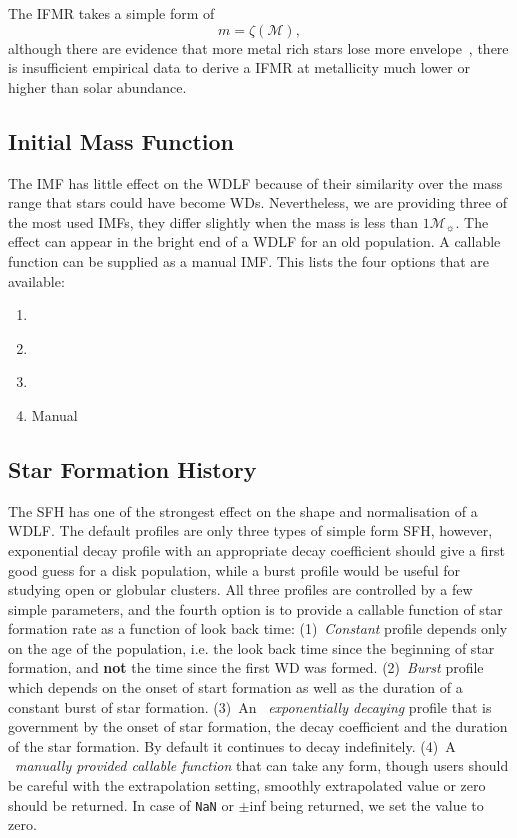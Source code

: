 \documentclass[fleqn,usenatbib]{rasti}
\newcommand{\msun}{\mathcal{M}_{\sun}}
\begin{document}
The IFMR takes a simple form of
\begin{equation}
    m = \zeta(\mathcal{M}),
\end{equation}
although there are evidence that more metal rich stars lose more
envelope~\citep{2007ApJ...671..761K}, there is insufficient empirical data to
derive a IFMR at metallicity much lower or higher than solar abundance.

\subsection{Initial Mass Function}
The IMF has little effect on the WDLF because of their similarity over the mass
range that stars could have become WDs. Nevertheless, we are providing three
of the most used IMFs, they differ slightly when the mass is less than $1\msun$.
The effect can appear in the bright end of a WDLF for an old population. A
callable function can be supplied as a manual IMF. This lists the four options
that are available:

\begin{enumerate}
    \item \citet{2001MNRAS.322..231K}
    \item \citet{2003PASP..115..763C}
    \item \citet[][including binary]{2003PASP..115..763C}
    \item Manual
\end{enumerate}

\subsection{Star Formation History}
The SFH has one of the strongest effect on the shape and normalisation of a
WDLF. The default profiles are only three types of simple form SFH, however,
exponential decay profile with an appropriate decay coefficient should give a
first good guess for a disk population, while a burst profile would be useful
for studying open or globular clusters. All three profiles are controlled by
a few simple parameters, and the fourth option is to provide a callable
function of star formation rate as a function of look back time:
(1)~\textit{Constant} profile depends only on the age of the population,
i.e. the look back time since the beginning of star formation,
and \textbf{not} the time since the first WD was formed. (2)~\textit{Burst}
profile which depends on the onset of start formation as well as the duration
of a constant burst of star formation. (3)~An ~\textit{exponentially decaying}
profile that is government by the onset of star formation, the decay coefficient
and the duration of the star formation. By default it continues to decay
indefinitely. (4)~A ~\textit{manually provided callable function} that can take
any form, though users should be careful with the extrapolation setting,
smoothly extrapolated value or zero should be returned. In case of \verb+NaN+
or $\pm$inf being returned, we set the value to zero.
\end{document}
